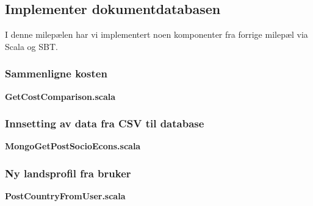 \subsection{Implementer dokumentdatabasen}
I denne milepælen har vi implementert noen komponenter fra forrige milepæl via Scala og SBT.

\subsubsection{Sammenligne kosten}
\textbf{GetCostComparison.scala}\\

\subsubsection{Innsetting av data fra CSV til database}
\textbf{MongoGetPostSocioEcons.scala}\\

\subsubsection{Ny landsprofil fra bruker}
\textbf{PostCountryFromUser.scala}\\
